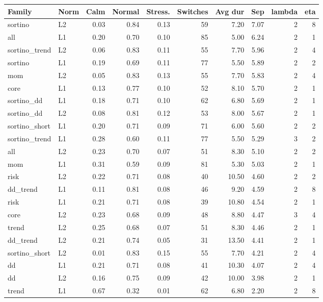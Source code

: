 \begin{tabular}{llrrrrrrrr}
\toprule
Family & Norm & Calm & Normal & Stress. & Switches & Avg dur & Sep & lambda & eta \\
\midrule
sortino & L2 & 0.03 & 0.84 & 0.13 & 59 & 7.20 & 7.07 & 2 & 8 \\
all & L1 & 0.20 & 0.70 & 0.10 & 85 & 5.00 & 6.24 & 2 & 1 \\
sortino_trend & L2 & 0.06 & 0.83 & 0.11 & 55 & 7.70 & 5.96 & 2 & 4 \\
sortino & L1 & 0.19 & 0.69 & 0.11 & 77 & 5.50 & 5.89 & 2 & 2 \\
mom & L2 & 0.05 & 0.83 & 0.13 & 55 & 7.70 & 5.83 & 2 & 4 \\
core & L1 & 0.13 & 0.77 & 0.10 & 52 & 8.10 & 5.70 & 2 & 1 \\
sortino_dd & L1 & 0.18 & 0.71 & 0.10 & 62 & 6.80 & 5.69 & 2 & 1 \\
sortino_dd & L2 & 0.08 & 0.81 & 0.12 & 53 & 8.00 & 5.67 & 2 & 1 \\
sortino_short & L1 & 0.20 & 0.71 & 0.09 & 71 & 6.00 & 5.60 & 2 & 2 \\
sortino_trend & L1 & 0.28 & 0.60 & 0.11 & 77 & 5.50 & 5.29 & 3 & 2 \\
all & L2 & 0.23 & 0.70 & 0.07 & 51 & 8.30 & 5.10 & 2 & 2 \\
mom & L1 & 0.31 & 0.59 & 0.09 & 81 & 5.30 & 5.03 & 2 & 1 \\
risk & L2 & 0.22 & 0.71 & 0.08 & 40 & 10.50 & 4.60 & 2 & 2 \\
dd_trend & L1 & 0.11 & 0.81 & 0.08 & 46 & 9.20 & 4.59 & 2 & 8 \\
risk & L1 & 0.21 & 0.71 & 0.08 & 39 & 10.80 & 4.54 & 2 & 1 \\
core & L2 & 0.23 & 0.68 & 0.09 & 48 & 8.80 & 4.47 & 3 & 4 \\
trend & L2 & 0.25 & 0.68 & 0.07 & 51 & 8.30 & 4.46 & 2 & 1 \\
dd_trend & L2 & 0.21 & 0.74 & 0.05 & 31 & 13.50 & 4.41 & 2 & 1 \\
sortino_short & L2 & 0.01 & 0.83 & 0.15 & 55 & 7.70 & 4.21 & 2 & 4 \\
dd & L1 & 0.21 & 0.71 & 0.08 & 41 & 10.30 & 4.07 & 2 & 4 \\
dd & L2 & 0.16 & 0.75 & 0.09 & 42 & 10.00 & 3.98 & 2 & 1 \\
trend & L1 & 0.67 & 0.32 & 0.01 & 62 & 6.80 & 2.20 & 2 & 8 \\
\bottomrule
\end{tabular}

